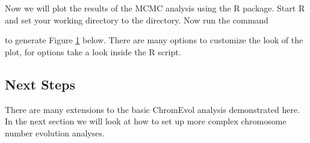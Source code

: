 Now we will plot the results of the MCMC analysis using the \RevGadgets R package.
Start R and set your working directory to the 
directory. Now run the command
\colorbox{black}{\strut\hspace{1mm}\textcolor[rgb]{0,1,1}{}} to generate Figure \ref{fig:chromevol_simple} below. There are many options to customize
the look of the plot, for options take a look inside the R script.
\begin{figure}[h!]
\label{fig:chromevol_simple}
\end{figure}

\subsection{Next Steps}

There are many extensions to the basic ChromEvol analysis demonstrated here. In the next
section we will look at how to set up more complex chromosome number evolution analyses.

 

\newpage
